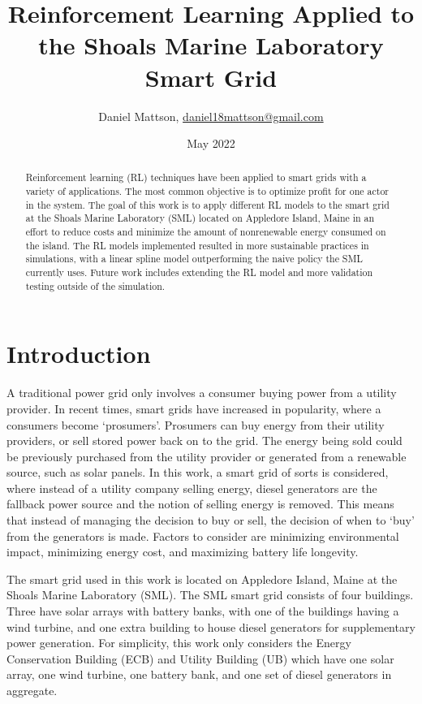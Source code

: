 \documentclass{article}
\title{Reinforcement Learning Applied to the Shoals Marine Laboratory Smart Grid}
\author{Daniel Mattson, \href{mailto:daniel18mattson@gmail.com}{daniel18mattson@gmail.com} }
\date{May 2022}
\begin{document}
\maketitle

\begin{abstract}
Reinforcement learning (RL) techniques have been applied to smart grids with a variety of applications. The most common objective is to optimize profit for one actor in the system. The goal of this work is to apply different RL models to the smart grid at the Shoals Marine Laboratory (SML) located on Appledore Island, Maine in an effort to reduce costs and minimize the amount of nonrenewable energy consumed on the island. The RL models implemented resulted in more sustainable practices in simulations, with a linear spline model outperforming the naive policy the SML currently uses. Future work includes extending the RL model and more validation testing outside of the simulation.
\end{abstract}

\section{Introduction}
A traditional power grid only involves a consumer buying power from a utility provider. In recent times, smart grids have increased in popularity, where a consumers become `prosumers'. Prosumers can buy energy from their utility providers, or sell stored power back on to the grid. The energy being sold could be previously purchased from the utility provider or generated from a renewable source, such as solar panels. In this work, a smart grid of sorts is considered, where instead of a utility company selling energy, diesel generators are the fallback power source and the notion of selling energy is removed. This means that instead of managing the decision to buy or sell, the decision of when to `buy' from the generators is made. Factors to consider are minimizing environmental impact, minimizing energy cost, and maximizing battery life longevity.

The smart grid used in this work is located on Appledore Island, Maine at the Shoals Marine Laboratory (SML). The SML smart grid consists of four buildings. Three have solar arrays with battery banks, with one of the buildings having a wind turbine, and one extra building to house diesel generators for supplementary power generation. For simplicity, this work only considers the Energy Conservation Building (ECB) and Utility Building (UB) which have one solar array, one wind turbine, one battery bank, and one set of diesel generators in aggregate. 
\end{document}
